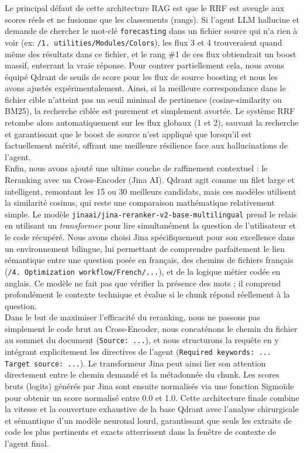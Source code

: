 Le principal défaut de cette architecture RAG est que le RRF est aveugle aux scores réels et ne fusionne que les classements (rangs). Si l'agent LLM hallucine et demande de chercher le mot-clé \texttt{forecasting} dans un fichier source qui n'a rien à voir (ex: \texttt{/1. utilities/Modules/Colors}), les flux 3 et 4 trouveraient quand même des résultats dans ce fichier, et le rang \#1 de ces flux obtiendrait un boost massif, enterrant la vraie réponse. Pour contrer partiellement cela, nous avons équipé Qdrant de seuils de score pour les flux de source boosting et nous les avons ajustés expérimentalement. Ainsi, si la meilleure correspondance dans le fichier cible n'atteint pas un seuil minimal de pertinence (cosine-similarity ou BM25), la recherche ciblée est purement et simplement avortée. Le système RRF retombe alors automatiquement sur les flux globaux (1 et 2), sauvant la recherche et garantissant que le boost de source n'est appliqué que lorsqu'il est factuellement mérité, offrant une meilleure résilience face aux hallucinations de l'agent. \\

Enfin, nous avons ajouté une ultime couche de raffinement contextuel : le Reranking avec un Cross-Encoder (Jina AI). Qdrant agit comme un filet large et intelligent, remontant les 15 ou 30 meilleurs candidats, mais ces modèles utilisent la similarité cosinus, qui reste une comparaison mathématique relativement simple. Le modèle \texttt{jinaai/jina-reranker-v2-base-multilingual} prend le relais en utilisant un \textit{transformer} pour lire simultanément la question de l'utilisateur et le code récupéré. Nous avons choisi Jina spécifiquement pour son excellence dans un environnement bilingue, lui permettant de comprendre parfaitement le lien sémantique entre une question posée en français, des chemins de fichiers français (\texttt{/4. Optimization workflow/French/...}), et de la logique métier codée en anglais. Ce modèle ne fait pas que vérifier la présence des mots ; il comprend profondément le contexte technique et évalue si le chunk répond réellement à la question.\\

Dans le but de maximiser l'efficacité du reranking, nous ne passons pas simplement le code brut au Cross-Encoder, nous concaténons le chemin du fichier au sommet du document (\texttt{Source: ...}), et nous structurons la requête en y intégrant explicitement les directives de l'agent (\texttt{Required keywords: ... Target source: ...}). Le transformeur Jina peut ainsi lier son attention directement entre le chemin demandé et la métadonnée du chunk. Les scores bruts (logits) générés par Jina sont ensuite normalisés via une fonction Sigmoïde pour obtenir un score normalisé entre 0.0 et 1.0. Cette architecture finale combine la vitesse et la couverture exhaustive de la base Qdrant avec l'analyse chirurgicale et sémantique d'un modèle neuronal lourd, garantissant que seuls les extraits de code les plus pertinents et exacts atterrissent dans la fenêtre de contexte de l'agent final.